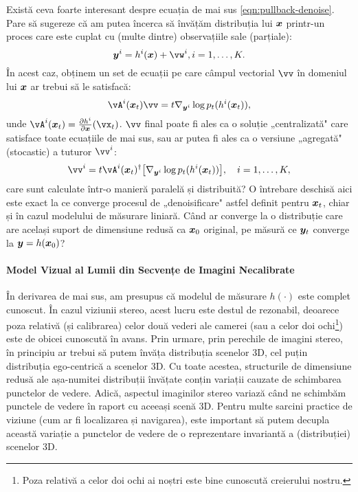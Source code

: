 \documentclass[../../book-main_ro.tex]{subfiles}
\begin{document}
\begin{remark}
{Există ceva foarte interesant despre ecuația de mai sus \eqref{eqn:pullback-denoise}. Pare să sugereze că am putea încerca să învățăm distribuția lui $\bm{x}$ printr-un proces care este cuplat cu (multe dintre) observațiile sale (parțiale):
\begin{equation}
\y^i = h^i(\x) +\vw^i, i =1, \ldots, K.
\end{equation} În acest caz, obținem un set de ecuații pe care câmpul vectorial $\vv$ în domeniul lui $\bm{x}$ ar trebui să le satisfacă:
\begin{equation}
    \vA^i(\x_t) \vv = t \nabla_{\y^i} \log p_t(h^i(\x_t)),
\label{eqn:federated-pushforward}
\end{equation}
unde $\vA^i(\x_t) = \frac{\partial h^i}{\partial \x}(\vx_t)$. $\vv$ final poate fi ales ca o soluție „centralizată" care satisface toate ecuațiile de mai sus, sau ar putea fi ales ca o versiune „agregată" (stocastic) a tuturor $\vv^i$:
\begin{equation}
    \vv^i = t\vA^i(\x_t)^\dagger \big[\nabla_{\y^i} \log p_t(h^i(\x_t))\big], \quad i = 1, \ldots, K,
\end{equation}
care sunt calculate într-o manieră paralelă și distribuită? O întrebare deschisă aici este exact la ce converge procesul de „denoisificare" astfel definit pentru $\bm{x}_t$, chiar și în cazul modelului de măsurare liniară. Când ar converge la o distribuție care are același suport de dimensiune redusă ca $\bm{x}_0$ original, pe măsură ce $\bm{y}_t$ converge la $\bm{y} = h(\bm{x}_0)$? }
\end{remark}



\paragraph{Model Vizual al Lumii din Secvențe de Imagini Necalibrate}

În derivarea de mai sus, am presupus că modelul de măsurare $h(\cdot)$ este complet cunoscut. În cazul viziunii stereo, acest lucru este destul de rezonabil, deoarece poza relativă (și calibrarea) celor două vederi ale camerei (sau a celor doi ochi\footnote{Poza relativă a celor doi ochi ai noștri este bine cunoscută creierului nostru.}) este de obicei cunoscută în avans. Prin urmare, prin perechile de imagini stereo, în principiu ar trebui să putem învăța distribuția scenelor 3D, cel puțin distribuția ego-centrică a scenelor 3D. Cu toate acestea, structurile de dimensiune redusă ale așa-numitei distribuții învățate conțin variații cauzate de schimbarea punctelor de vedere. Adică, aspectul imaginilor stereo variază când ne schimbăm punctele de vedere în raport cu aceeași scenă 3D. Pentru multe sarcini practice de viziune (cum ar fi localizarea și navigarea), este important să putem decupla această variație a punctelor de vedere de o reprezentare invariantă a (distribuției) scenelor 3D.
\end{document}
